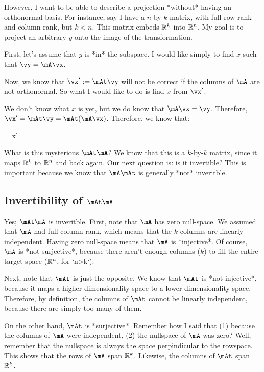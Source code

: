 However, I want to be able to describe a projection *without* having an
orthonormal basis. For instance, say I have a $n$-by-$k$ matrix, with
full row rank and column rank, but $k<n$. This matrix embeds $\mathbb{R}^k$ into
$\mathbb{R}^n$. My goal is to project an arbitrary $y$ onto the image of the
transformation.

First, let's assume that $y$ is *in* the subspace. I would like simply
to find $x$ such that $\vy = \mA\vx$.

Now, we know that $\vx' := \mAt \vy$ will not be correct if the columns
of $\mA$ are not orthonormal. So what I would like to do is find $x$
from $\vx'$.

We don't know what $x$ is yet, but we do know that $\mA\vx=\vy$.
Therefore, $\vx' = \mAt \vy = \mAt(\mA\vx)$. Therefore, we know that:

\begin{nedqn}
  \vx = \parensinv{\mAt\mA} x' = \parensinv{\mAt\mA} \parens{\mAt \vy}
\end{nedqn}

What is this mysterious $\mAt\mA$? We know that this is a $k$-by-$k$
matrix, since it maps $\mathbb{R}^k$ to $\mathbb{R}^n$ and back again. Our next question
is: is it invertible? This is important because we know that $\mA\mAt$
is generally *not* inveritble.

\subsection{Invertibility of $\mAt\mA$}

Yes; $\mAt\mA$ is inveritble. First, note that $\mA$ has zero null-space.
We assumed that $\mA$ had full column-rank, which means that the $k$
columns are linearly independent. Having zero null-space means that $\mA$
is *injective*. Of course, $\mA$ is *not surjective*, because there aren't
enough columns ($k$) to fill the entire target space ($\mathbb{R}^n$, for `n>k`).

Next, note that $\mAt$ is just the opposite. We know that $\mAt$
is *not injective*, because it maps a higher-dimensionality space to a
lower dimensionality-space. Therefore, by definition, the columns of
$\mAt$ cannot be linearly independent, because there are simply too
many of them.

On the other hand, $\mAt$ is *surjective*. Remember how I said that
(1) because the columns of $\mA$ were independent, (2) the nullspace of
$\mA$ was zero? Well, remember that the nullspace is always the space
perpindicular to the rowspace. This shows that the rows of $\mA$ span
$\mathbb{R}^k$. Likewise, the columns of $\mAt$ span $\mathbb{R}^k$.

